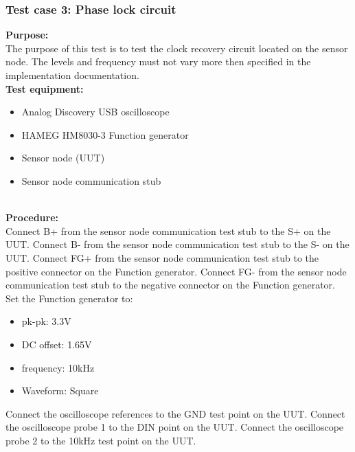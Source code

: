 \subsubsection{Test case 3: Phase lock circuit}
\textbf{Purpose:}\\
The purpose of this test is to test the clock recovery circuit located on the sensor node. The levels and frequency must not vary more then specified in the implementation documentation.\\

\textbf{Test equipment:}
\begin{itemize}
	\item Analog Discovery USB oscilloscope
	\item HAMEG HM8030-3 Function generator
	\item Sensor node (UUT)
	\item Sensor node communication stub
\end{itemize}
\ \\
\textbf{Procedure:}\\
Connect B+ from the sensor node communication test stub to the S+ on the UUT. Connect B- from the sensor node communication test stub to the S- on the UUT.
Connect FG+ from the sensor node communication test stub to the positive connector on the Function generator. Connect FG- from the sensor node communication test stub to the negative connector on the Function generator.\\ Set the Function generator to:
\begin{itemize}
	\item pk-pk: 3.3V
	\item DC offset: 1.65V
	\item frequency: 10kHz
	\item Waveform: Square
\end{itemize}

Connect the oscilloscope references to the GND test point on the UUT.
Connect the oscilloscope probe 1 to the DIN point on the UUT.
Connect the oscilloscope probe 2 to the 10kHz test point on the UUT.\\


